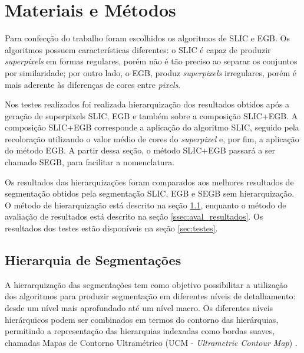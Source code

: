 \begin{document}

\section{Materiais e Métodos} \label{sec:mat_metodos}

Para confecção do trabalho foram escolhidos os algoritmos de SLIC e EGB. Os algoritmos possuem características diferentes: o SLIC é capaz de produzir \textit{superpixels} em formas regulares, porém não é tão preciso ao separar os conjuntos por similaridade; por outro lado, o EGB, produz \textit{superpixels} irregulares, porém é mais aderente às diferenças de cores entre \textit{pixels}.

Nos testes realizados foi realizada hierarquização dos resultados obtidos após a geração de superpixels SLIC, EGB e também sobre a composição SLIC+EGB. A composição SLIC+EGB corresponde a aplicação do algoritmo SLIC, seguido pela recoloração utilizando o valor médio de cores do \textit{superpixel} e, por fim, a aplicação do método EGB. A partir dessa seção, o método SLIC+EGB passará a ser chamado SEGB, para facilitar a nomenclatura.

Os resultados das hierarquizações foram comparados aos melhores resultados de segmentação obtidos pela segmentação SLIC, EGB e SEGB sem hierarquização. O método de hierarquização está descrito na seção \ref{ssec:hierquia_segm}, enquanto o método de avaliação de resultados está descrito na seção \ref{ssec:aval_resultados}. Os resultados dos testes estão disponíveis na seção \ref{sec:testes}.


\subsection{Hierarquia de Segmentações} \label{ssec:hierquia_segm}


A hierarquização das segmentações tem como objetivo possibilitar a utilização dos algoritmos para produzir segmentação em diferentes níveis de detalhamento: desde um nível mais aprofundado até um nível macro. Os diferentes níveis hierárquicos podem ser combinados em termos do contorno das hierárquias, permitindo a representação das hierarquias indexadas como bordas suaves, chamadas Mapas de Contorno Ultramétrico (UCM - \textit{Ultrametric Contour Map}) \cite{ULTRAMETRIC}.
\end{document}

